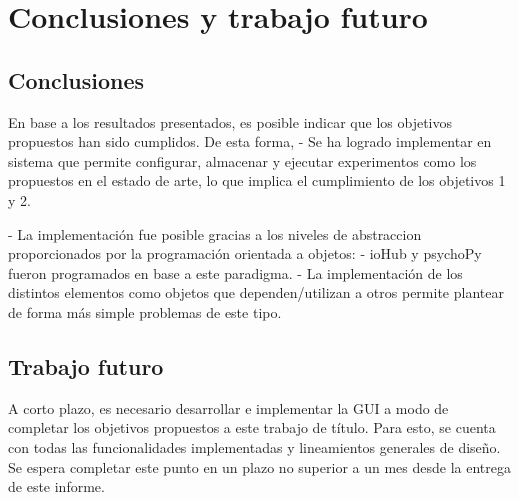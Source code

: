 \documentclass[\main/main.tex]{subfiles}
\begin{document}
\chapter{Conclusiones y trabajo futuro}
\label{cha:05_conclusiones_y_trabajo_futuro}
	\section{Conclusiones}
	\label{sec:05_conclusiones}
		En base a los resultados presentados, es posible indicar que los objetivos propuestos han sido cumplidos. De esta forma, 
		- Se ha logrado implementar en sistema que permite configurar, almacenar y ejecutar experimentos como los propuestos en el estado de arte, lo que implica el cumplimiento de los objetivos 1 y 2.
		
		- La implementación fue posible gracias a los niveles de abstraccion proporcionados por la programación orientada a objetos:
			- ioHub y psychoPy fueron programados en base a este paradigma.
			- La implementación de los distintos elementos como objetos que dependen/utilizan a otros permite plantear de forma más simple problemas de este tipo.
		 

	\section{Trabajo futuro}
	\label{sec:05_trabajo_futuro}
		A corto plazo, es necesario desarrollar e implementar la GUI a modo de completar los objetivos propuestos a este trabajo de título. Para esto, se cuenta con todas las funcionalidades implementadas y lineamientos generales de diseño. Se espera completar este punto en un plazo no superior a un mes desde la entrega de este informe.  
\end{document}
